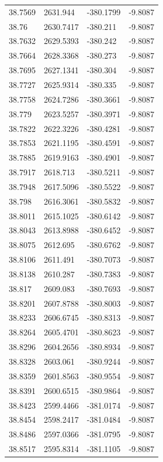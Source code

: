 \begin{table}[H]
\begin{tabular}{llll}
38.7569 & 2631.944 & -380.1799 & -9.8087 \\
38.76 & 2630.7417 & -380.211 & -9.8087 \\
38.7632 & 2629.5393 & -380.242 & -9.8087 \\
38.7664 & 2628.3368 & -380.273 & -9.8087 \\
38.7695 & 2627.1341 & -380.304 & -9.8087 \\
38.7727 & 2625.9314 & -380.335 & -9.8087 \\
38.7758 & 2624.7286 & -380.3661 & -9.8087 \\
38.779 & 2623.5257 & -380.3971 & -9.8087 \\
38.7822 & 2622.3226 & -380.4281 & -9.8087 \\
38.7853 & 2621.1195 & -380.4591 & -9.8087 \\
38.7885 & 2619.9163 & -380.4901 & -9.8087 \\
38.7917 & 2618.713 & -380.5211 & -9.8087 \\
38.7948 & 2617.5096 & -380.5522 & -9.8087 \\
38.798 & 2616.3061 & -380.5832 & -9.8087 \\
38.8011 & 2615.1025 & -380.6142 & -9.8087 \\
38.8043 & 2613.8988 & -380.6452 & -9.8087 \\
38.8075 & 2612.695 & -380.6762 & -9.8087 \\
38.8106 & 2611.491 & -380.7073 & -9.8087 \\
38.8138 & 2610.287 & -380.7383 & -9.8087 \\
38.817 & 2609.083 & -380.7693 & -9.8087 \\
38.8201 & 2607.8788 & -380.8003 & -9.8087 \\
38.8233 & 2606.6745 & -380.8313 & -9.8087 \\
38.8264 & 2605.4701 & -380.8623 & -9.8087 \\
38.8296 & 2604.2656 & -380.8934 & -9.8087 \\
38.8328 & 2603.061 & -380.9244 & -9.8087 \\
38.8359 & 2601.8563 & -380.9554 & -9.8087 \\
38.8391 & 2600.6515 & -380.9864 & -9.8087 \\
38.8423 & 2599.4466 & -381.0174 & -9.8087 \\
38.8454 & 2598.2417 & -381.0484 & -9.8087 \\
38.8486 & 2597.0366 & -381.0795 & -9.8087 \\
38.8517 & 2595.8314 & -381.1105 & -9.8087 \\

\end{tabular}
\end{table}
